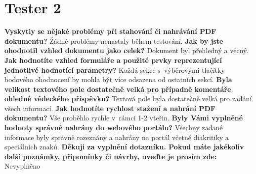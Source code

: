 \section{Tester 2}

\textbf{Vyskytly se nějaké problémy při stahování či nahrávání PDF dokumentu?}
\newline
Žádné problémy nenastaly během testování.
\newline
\newline
\textbf{Jak by jste ohodnotil vzhled dokumentu jako celek?}
\newline
Dokument byl přehledný a věcný.
\newline
\newline
\textbf{Jak hodnotíte vzhled formuláře a použité prvky reprezentující jednotlivé hodnotící parametry?}
\newline
Každá sekce s~výběrovými tlačítky bodového ohodnocení by mohla být více odsazena od ostatních sekcí.
\newline
\newline
\textbf{Byla velikost textového pole dostatečně velká pro případně komentáře ohledně vědeckého příspěvku?}
\newline
Textová pole byla dostatečně velká pro zadání všech informací.
\newline
\newline
\textbf{Jak hodnotíte rychlost stažení a nahrání PDF dokumentu?} 
\newline
Vše proběhlo rychle v~rámci 1-2 vteřin.
\newline
\newline
\textbf{Byly Vámi vyplněné hodnoty správně nahrány do webového portálu?}
\newline
Všechny zadané informace byly správně rozeznány a nahrány na portál včetně diakritiky a speciálních znaků.
\newline
\newline
\textbf{Děkuji za vyplnění dotazníku. Pokud máte jakékoliv další poznámky, připomínky či návrhy, uveďte je prosím zde:}
\newline
Nevyplněno
\newpage 
